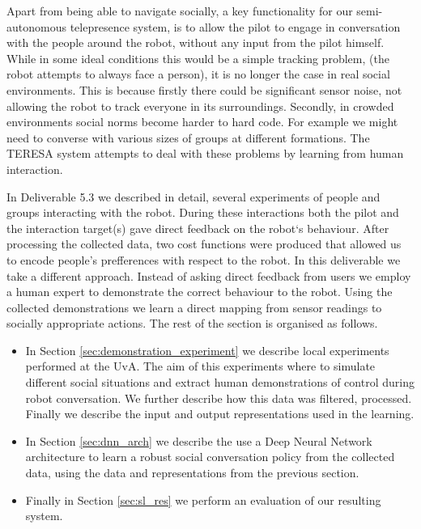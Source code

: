 \documentclass[a4paper,11pt]{report}
\begin{document}
Apart from being able to navigate socially, a key functionality for our semi-autonomous telepresence system, is to allow the pilot to engage in conversation 
with the people around the robot, without any input from the pilot himself. While in some ideal conditions this would be a simple tracking problem, (the robot attempts to always face a person), it is no longer the case in real social environments. This is because firstly there could be significant sensor noise, not allowing the robot to track everyone in its surroundings. Secondly, in crowded environments social norms become harder to hard code. For example we might need to converse with various sizes of groups at different formations. The TERESA system attempts to deal with these problems by learning from human interaction.

In Deliverable 5.3 we described in detail, several experiments of people and groups interacting with the robot. During these interactions both the pilot and the interaction target(s) gave direct feedback on the robot`s behaviour. After processing the collected data, two cost functions were produced that allowed us to encode people's prefferences with respect to the robot. In this deliverable we take a different approach. Instead of asking direct feedback from users we employ a human expert to demonstrate the correct behaviour to the robot. Using the collected demonstrations we learn a direct mapping from sensor readings to socially appropriate actions. The rest of the section is organised as follows. 

\begin{itemize}
	\item In Section \ref{sec:demonstration_experiment} we describe local experiments performed at the UvA. The aim of this experiments where to simulate different social situations and extract human demonstrations of control during robot conversation. We further describe how this data was filtered, processed. Finally we describe the input and output representations used in the learning.
	\item In Section \ref{sec:dnn_arch} we describe the use a Deep Neural Network architecture to learn a robust social conversation policy from the collected data, using the data and representations from the previous section. 
	\item Finally in Section \ref{sec:sl_res} we perform an evaluation of our resulting system.
\end{itemize} 
\end{document}
